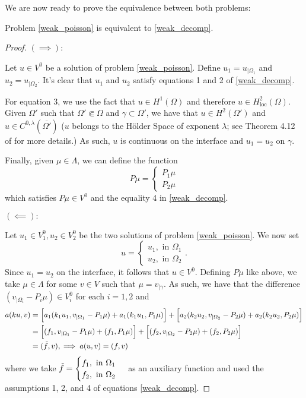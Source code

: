 We are now ready to prove the equivalence between both problems:
\begin{theorem}\label{equivalence_transmission}
    Problem \eqref{weak_poisson} is equivalent to \eqref{weak_decomp}.
\end{theorem}
\begin{proof}
    \((\implies):\)

    Let \(u \in V^0\) be a solution of problem \eqref{weak_poisson}. Define \(u_1 = u_{|\Omega_1}\) and \(u_2 = u_{|\Omega_2}\). It's clear that \(u_1\) and \(u_2\) satisfy equations 1 and 2 of \eqref{weak_decomp}. 
    
    For equation 3, we use the fact that \(u \in H^1(\Omega)\) and therefore \(u \in H^2_{\text{loc}}(\Omega)\). Given \(\Omega'\) such that \(\Omega' \Subset \Omega\) and \(\gamma \subset \Omega'\), we have that \(u \in H^2(\Omega')\) and \(u \in C^{0,\lambda}(\overline{\Omega'})\) (\(u\) belongs to the H\"{o}lder Space of exponent \(\lambda\); see Theorem 4.12 of \cite{adams2003sobolev} for more details.) As such, \(u\) is continuous on the interface and \(u_1=u_2\) on \(\gamma\).

    Finally, given \(\mu \in \Lambda\), we can define the function
    \[
        P \mu =
    \begin{cases}
        P_1 \mu\\
        P_2 \mu
    \end{cases}
    \]
    which satisfies \(P \mu \in V^0\) and the equality 4 in \eqref{weak_decomp}.

    \vspace*{0.5cm}
    \((\impliedby):\)

    Let \(u_1 \in V_1^0, u_2 \in V_2^0\) be the two solutions of problem \eqref{weak_poisson}. We now set
    \[
    u=\begin{cases}
        u_1, \text{ in } \Omega_1\\
        u_2, \text{ in } \Omega_2
    \end{cases}.
    \]
    Since \(u_1=u_2\) on the interface, it follows that \(u \in V^0\).  
    Defining \(P \mu\) like above, we take \(\mu \in \Lambda\) for some \(v \in V\) such that \(\mu = v_{|\gamma}\). As such, we have that the difference \((v_{|\Omega_i} - P_i \mu) \in V^0_i\) for each \(i=1, 2\) and
    \begin{align*}
        a(k u, v) &= \Big[a_1(k_1 u_1, v_{|\Omega_1} - P_1 \mu) + a_1(k_1 u_1, P_1\mu)\Big] + \Big[a_2(k_2 u_2, v_{|\Omega_2} - P_2 \mu) + a_2(k_2 u_2, P_2\mu)\Big]\\
        &=\Big[(f_1, v_{|\Omega_1} - P_1 \mu) + (f_1, P_1 \mu) \Big] + \Big[(f_2, v_{|\Omega_2} - P_2 \mu) + (f_2, P_2 \mu) \Big]\\
        &=(\Tilde{f}, v), \implies a(u, v) = (f, v)
    \end{align*}
    where we take \(\Tilde{f} = \begin{cases}
        f_1, \text{ in } \Omega_1\\
        f_2, \text{ in } \Omega_2
    \end{cases}\)
    as an auxiliary function and used the assumptions 1, 2, and 4 of equations \eqref{weak_decomp}.
\end{proof}
